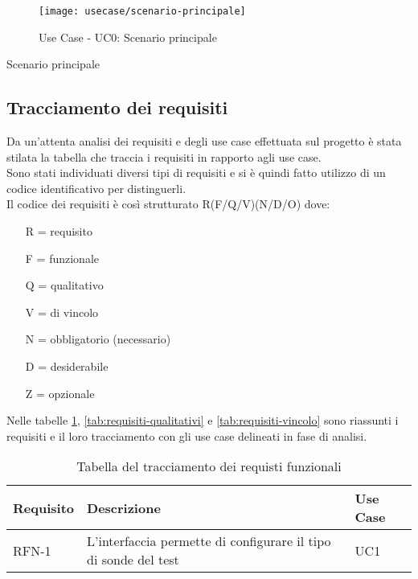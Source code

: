 \begin{enumerate}
	\begin{figure}[!h] 
		\centering 
		\texttt{[image: usecase/scenario-principale]} 
		\caption{Use Case - UC0: Scenario principale}
	\end{figure}
	
	\begin{usecase}{0}{Scenario principale}
		\label{uc:scenario-principale}
	\end{usecase}
	
	\subsection{Tracciamento dei requisiti}
	
	Da un'attenta analisi dei requisiti e degli use case effettuata sul progetto è stata stilata la tabella che traccia i requisiti in rapporto agli use case.\\
	Sono stati individuati diversi tipi di requisiti e si è quindi fatto utilizzo di un codice identificativo per distinguerli.\\
	Il codice dei requisiti è così strutturato R(F/Q/V)(N/D/O) dove:
	\begin{enumerate}
		\item[R =] requisito
		\item[F =] funzionale
		\item[Q =] qualitativo
		\item[V =] di vincolo
		\item[N =] obbligatorio (necessario)
		\item[D =] desiderabile
		\item[Z =] opzionale
	\end{enumerate}
	Nelle tabelle \ref{tab:requisiti-funzionali}, \ref{tab:requisiti-qualitativi} e \ref{tab:requisiti-vincolo} sono riassunti i requisiti e il loro tracciamento con gli use case delineati in fase di analisi.
	
	\newpage
	
	\begin{table}%
		\caption{Tabella del tracciamento dei requisti funzionali}
		\label{tab:requisiti-funzionali}
		\begin{tabularx}{\textwidth}{lXl}
			\hline\hline
			\textbf{Requisito} & \textbf{Descrizione} & \textbf{Use Case}\\
			\hline
			RFN-1     & L'interfaccia permette di configurare il tipo di sonde del test & UC1 \\
			\hline
		\end{tabularx}
	\end{table}%
	

\end{enumerate}
